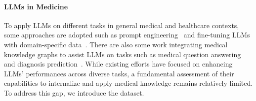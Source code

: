 \paragraph{LLMs in Medicine}
To apply LLMs on different tasks in general medical and healthcare contexts, some approaches are adopted such as prompt engineering~\cite{shi2024ehragent, chen2024cod, singhal2025toward} and fine-tuning LLMs with domain-specific data~\cite{singhal2025toward, xu2023baize, xie2024me, chen2023meditron70b, shi2024mgh, xiong2023doctorglm, zhao2024helene}.
There are also some work integrating medical knowledge graphs to assist LLMs on tasks such as medical question answering~\cite{yang2024kg, yasunaga2022deep} and diagnosis prediction~\cite{afshar2024role, gao2023leveraging}.
While existing efforts have focused on enhancing LLMs' performances across diverse tasks, a fundamental assessment of their capabilities to internalize and apply medical knowledge remains relatively limited. To address this gap, we introduce the \mkj dataset.

